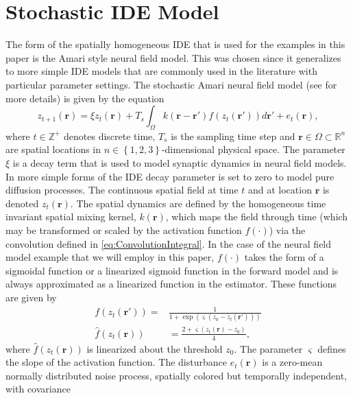 \documentclass[10pt,twocolumn,twoside]{IEEEtran}
\begin{document}
\section{Stochastic IDE Model}
The form of the spatially homogeneous IDE that is used for the examples in this paper is the Amari style neural field model. This was chosen since it generalizes to more simple IDE models that are commonly used in the literature with particular parameter settings. The stochastic Amari neural field model (see \cite{Freestone2011} for more details) is given by the equation  
\begin{equation}
 z_{t+1}\left(\mathbf{r}\right)=\xi z_t(\mathbf{r})+T_s\int_{\Omega}k\left(\mathbf{r}-\mathbf{r}'\right)f(z_{t}\left(\mathbf{r}'\right))d\mathbf{r}'+e_{t}\left(\mathbf{r}\right),
\label{eq:ConvolutionIntegral}
\end{equation}
where $t\in \mathbb{Z}^{+} $ denotes discrete time, $T_s$ is the sampling time step and $\mathbf{r} \in \Omega \subset \mathbb{R}^{n}$ are spatial locations in $n \in \left\lbrace 1,2,3 \right\rbrace $-dimensional physical space. The parameter $\xi$ is a decay term that is used to model synaptic dynamics in neural field models. In more simple forms of the IDE decay parameter is set to zero to model pure diffusion processes. The continuous spatial field at time $t$ and at location $\mathbf r$ is denoted $z_t\left(\mathbf r\right)$. The spatial dynamics are defined by the homogeneous time invariant spatial mixing kernel, $k\left(\mathbf{r}\right)$, which maps the field through time (which may be transformed or scaled by the activation function $f(\cdot)$) via the convolution defined in \eqref{eq:ConvolutionIntegral}. In the case of the neural field model example that we will employ in this paper, $f(\cdot)$ takes the form of a sigmoidal function or a linearized sigmoid function in the forward model and is always approximated as a linearized function in the estimator. These functions are given by
\begin{align}
	\label{ActivationFunction} f\left( z_t\left( \mathbf{r}'\right) \right) =& \frac{1}{1 + \exp \left( \varsigma \left( z_0 - z_t\left(\mathbf{r}'\right) \right) \right)} \\
	\hat{f}(z_t\left(\mathbf{r}\right)) &=\frac{2 + \varsigma(z_t\left(\mathbf{r}\right) - z_0)}{4}, 
\end{align}
where $\hat{f}(z_t\left(\mathbf{r}\right))$ is linearized about the threshold $z_0$. The parameter $\varsigma$ defines the slope of the activation function. The disturbance $e_{t}(\mathbf{r})$ is a zero-mean normally distributed noise process, spatially colored but temporally independent, with covariance \cite{Rasmussen2005}
\end{document}
